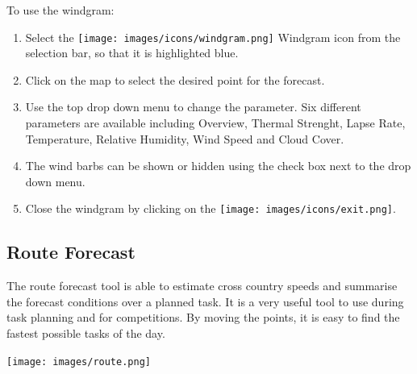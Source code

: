 \documentclass[11pt,a4paper]{article}
\begin{document}
To use the windgram:
\begin{enumerate}
\item Select the \texttt{[image: images/icons/windgram.png]} Windgram icon from the selection bar, so that it is highlighted blue.
\item Click on the map to select the desired point for the forecast.
\item Use the top drop down menu to change the parameter. Six different parameters are available including Overview, Thermal Strenght, Lapse Rate, Temperature, Relative Humidity, Wind Speed and Cloud Cover.
\item The wind barbs can be shown or hidden using the check box next to the drop down menu.
\item Close the windgram by clicking on the \texttt{[image: images/icons/exit.png]}.
\end{enumerate}

\subsection{Route Forecast}\label{subsec:routeforecast}
The route forecast tool is able to estimate cross country speeds and summarise the forecast conditions over a planned task. It is a very useful tool to use during task planning and for competitions. By moving the points, it is easy to find the fastest possible tasks of the day.
\begin{center}
\texttt{[image: images/route.png]}
\end{center}
\end{document}
